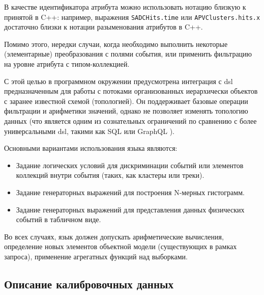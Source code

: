 В качестве идентификатора атрибута можно использовать нотацию близкую
к принятой в C++: например, выражения \texttt{SADCHits.time} или
\texttt{APVClusters.hits.x} достаточно близки к нотации разыменования
атрибутов в C++.

Помимо этого, нередки случаи, когда необходимо выполнить некоторые (элементарные)
преобразования с полями события, или применить фильтрацию на уровне
атрибута с типом-коллекцией. %

С этой целью в программном окружении предусмотрена интеграция с
\acrshort{dsl} предназначенным для работы с потоками организованных
иерархически
объектов с заранее известной схемой (топологией). Он поддерживает базовые
операции фильтрации и арифметики значений, однако не позволяет изменять
топологию данных (что является одним из сознательных ограничений по сравнению с
более универсальными \acrshort{dsl}, такими как SQL или GraphQL \cite{graphql-comparative}).

Основными вариантами использования языка являются:
\begin{itemize}
    \item Задание логических условий для дискриминации событий или элементов
    коллекций внутри события (таких, как кластеры или треки).
    \item Задание генераторных выражений для построения N-мерных гистограмм.
    \item Задание генераторных выражений для представления данных физических
    событий в табличном виде.
\end{itemize}
Во всех случаях, язык должен допускать арифметические вычисления,
определение новых элементов объектной модели (существующих в рамках
запроса), применение агрегатных функций над выборками.

\subsection{Описание калибровочных данных}

